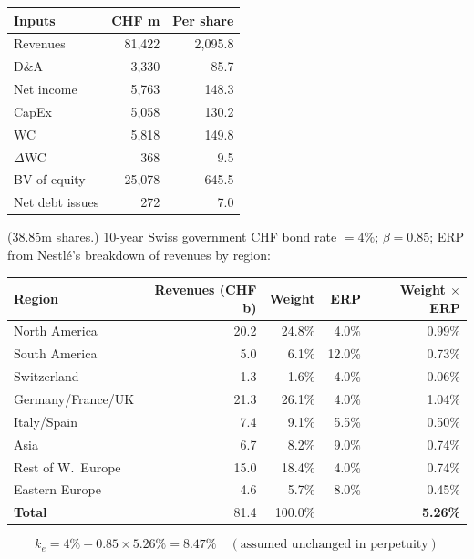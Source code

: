 \begin{exbox}
\begin{center}
\small
\begin{tabular}{@{}lrr@{}}
\toprule
\textbf{Inputs} & \textbf{CHF m} & \textbf{Per share}\\
\midrule
Revenues & 81,422 & 2,095.8\\
D\&A & 3,330 & 85.7\\
Net income & 5,763 & 148.3\\
CapEx & 5,058 & 130.2\\
WC & 5,818 & 149.8\\
$\Delta$WC & 368 & 9.5\\
BV of equity & 25,078 & 645.5\\
Net debt issues & 272 & 7.0\\
\bottomrule
\end{tabular}
\end{center}
(38.85m shares.) 10-year Swiss government CHF bond rate $=4\%$; $\beta=0.85$; ERP from Nestl\'e's breakdown of revenues by region:
\begin{center}
\small
\begin{tabular}{@{}lrrrr@{}}
\toprule
\textbf{Region} & \textbf{Revenues (CHF b)} & \textbf{Weight} & \textbf{ERP} & \textbf{Weight $\times$ ERP}\\
\midrule
North America & 20.2 & 24.8\% & 4.0\% & 0.99\%\\
South America & 5.0 & 6.1\% & 12.0\% & 0.73\%\\
Switzerland & 1.3 & 1.6\% & 4.0\% & 0.06\%\\
Germany/France/UK & 21.3 & 26.1\% & 4.0\% & 1.04\%\\
Italy/Spain & 7.4 & 9.1\% & 5.5\% & 0.50\%\\
Asia & 6.7 & 8.2\% & 9.0\% & 0.74\%\\
Rest of W.\ Europe & 15.0 & 18.4\% & 4.0\% & 0.74\%\\
Eastern Europe & 4.6 & 5.7\% & 8.0\% & 0.45\%\\
\midrule
\textbf{Total} & 81.4 & 100.0\% & & \textbf{5.26\%}\\
\bottomrule
\end{tabular}
\end{center}
\[
k_e=4\%+0.85\times5.26\%=\mathbf{8.47\%}\quad(\text{assumed unchanged in perpetuity})
\]
\end{exbox}

